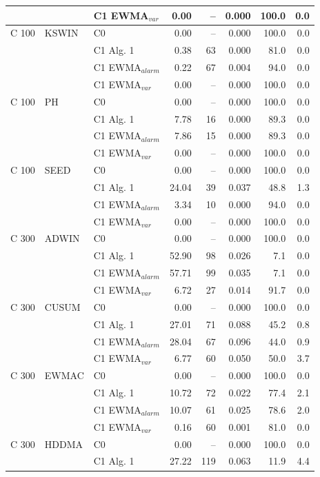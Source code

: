 \begin{longtable}{lllrrrrr}
 &  & C1 EWMA$_{var}$ & 0.00 & -- & 0.000 & 100.0 & 0.0 \\
\hline
C  100 & KSWIN & C0 & 0.00 & -- & 0.000 & 100.0 & 0.0 \\
 &  & C1 Alg. 1 & 0.38 & 63 & 0.000 & 81.0 & 0.0 \\
 &  & C1 EWMA$_{alarm}$ & 0.22 & 67 & 0.004 & 94.0 & 0.0 \\
 &  & C1 EWMA$_{var}$ & 0.00 & -- & 0.000 & 100.0 & 0.0 \\
\hline
C  100 & PH & C0 & 0.00 & -- & 0.000 & 100.0 & 0.0 \\
 &  & C1 Alg. 1 & 7.78 & 16 & 0.000 & 89.3 & 0.0 \\
 &  & C1 EWMA$_{alarm}$ & 7.86 & 15 & 0.000 & 89.3 & 0.0 \\
 &  & C1 EWMA$_{var}$ & 0.00 & -- & 0.000 & 100.0 & 0.0 \\
\hline
C  100 & SEED & C0 & 0.00 & -- & 0.000 & 100.0 & 0.0 \\
 &  & C1 Alg. 1 & 24.04 & 39 & 0.037 & 48.8 & 1.3 \\
 &  & C1 EWMA$_{alarm}$ & 3.34 & 10 & 0.000 & 94.0 & 0.0 \\
 &  & C1 EWMA$_{var}$ & 0.00 & -- & 0.000 & 100.0 & 0.0 \\
\hline
C  300 & ADWIN & C0 & 0.00 & -- & 0.000 & 100.0 & 0.0 \\
 &  & C1 Alg. 1 & 52.90 & 98 & 0.026 & 7.1 & 0.0 \\
 &  & C1 EWMA$_{alarm}$ & 57.71 & 99 & 0.035 & 7.1 & 0.0 \\
 &  & C1 EWMA$_{var}$ & 6.72 & 27 & 0.014 & 91.7 & 0.0 \\
\hline
C  300 & CUSUM & C0 & 0.00 & -- & 0.000 & 100.0 & 0.0 \\
 &  & C1 Alg. 1 & 27.01 & 71 & 0.088 & 45.2 & 0.8 \\
 &  & C1 EWMA$_{alarm}$ & 28.04 & 67 & 0.096 & 44.0 & 0.9 \\
 &  & C1 EWMA$_{var}$ & 6.77 & 60 & 0.050 & 50.0 & 3.7 \\
\hline
C  300 & EWMAC & C0 & 0.00 & -- & 0.000 & 100.0 & 0.0 \\
 &  & C1 Alg. 1 & 10.72 & 72 & 0.022 & 77.4 & 2.1 \\
 &  & C1 EWMA$_{alarm}$ & 10.07 & 61 & 0.025 & 78.6 & 2.0 \\
 &  & C1 EWMA$_{var}$ & 0.16 & 60 & 0.001 & 81.0 & 0.0 \\
\hline
C  300 & HDDMA & C0 & 0.00 & -- & 0.000 & 100.0 & 0.0 \\
 &  & C1 Alg. 1 & 27.22 & 119 & 0.063 & 11.9 & 4.4 \\

\end{longtable}
